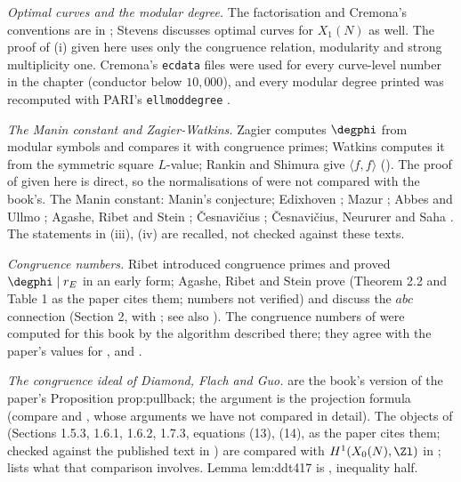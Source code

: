 \emph{Optimal curves and the modular degree.} The factorisation  and Cremona's conventions are in \cite[Chapter II]{Cremona97}; Stevens \cite{Stevens89} discusses optimal curves
for $X_1(N)$ as well. The proof of (i) given here uses only the congruence relation, modularity and strong multiplicity one. Cremona's \texttt{ecdata} files \cite{ecdata} were
used for every curve-level number in the chapter (conductor below $10{,}000$), and every modular degree printed was recomputed with PARI's \texttt{ellmoddegree} \cite{PARI}.

\emph{The Manin constant and Zagier-Watkins.} Zagier \cite{Zagier85} computes $\degphi$ from modular symbols and compares it with congruence primes; Watkins \cite{Watkins02} computes it from the symmetric
square $L$-value; Rankin and Shimura \cite{Rankin39,Shimura76} give $\langle f,f\rangle$ (). The proof of  given here is direct, so the normalisations of
\cite{Zagier85,Watkins02} were not compared with the book's. The Manin constant: Manin's conjecture; Edixhoven \cite{Edixhoven91}; Mazur \cite{Mazur78}; Abbes and Ullmo \cite{AU96}; Agashe, Ribet and Stein
\cite{ARS06}; \v Cesnavi\v cius \cite{Cesnavicius18}; \v Cesnavi\v cius, Neururer and Saha \cite{CNS}. The statements in (iii), (iv) are recalled, not checked against these
texts.

\emph{Congruence numbers.} Ribet \cite{Ribet83} introduced congruence primes and proved $\degphi\mid r_E$ in an early form; Agashe, Ribet and Stein \cite{ARS12} prove  (Theorem 2.2 and
Table 1 as the paper cites them; numbers not verified) and discuss the $abc$ connection (Section 2, with \cite{Frey,MaiMurty}; see also \cite{Murty99}). The congruence numbers of
 were computed for this book by the algorithm described there; they agree with the paper's values for ,  and .

\emph{The congruence ideal of Diamond, Flach and Guo.}  are the book's version of the paper's Proposition prop:pullback; the
argument is the projection formula (compare \cite{Zagier85} and \cite{ARS12}, whose arguments we have not compared in detail). The objects of \cite{DFG04} (Sections 1.5.3, 1.6.1, 1.6.2, 1.7.3, equations (13), (14), as the paper cites them; checked against the published text in ) are
compared with $H^1(X_0(N),\Zl)$ in ;  lists what that comparison involves. Lemma lem:ddt417 is \cite[Lemma 4.17]{DDT}, inequality half.

